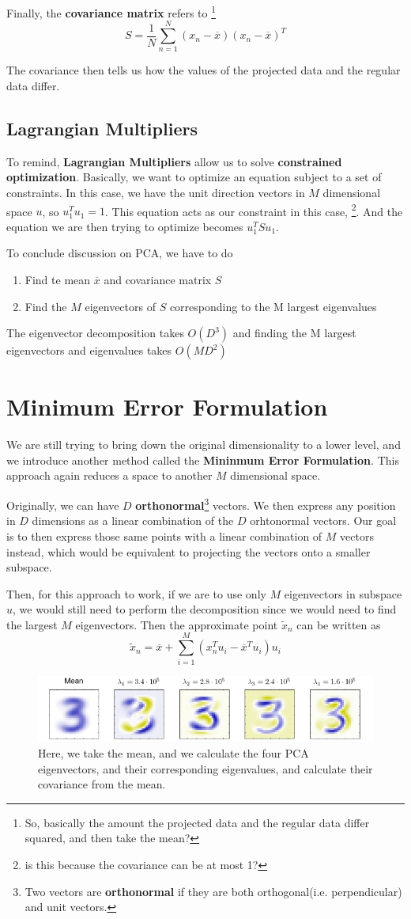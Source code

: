 \documentclass{tufte-handout}
\begin{document}
Finally, the \textbf{covariance matrix} refers to \footnote{So, basically the amount the projected
data and the regular data differ squared, and then take the mean?}
\[ S = \frac{1}{N}\sum_{n=1}^{N}(x_{n} - \overline{x})(x_{n} - \overline{x})^{T}\]

The covariance then tells us how the values of the projected data and the regular data differ. 
\subsection{Lagrangian Multipliers}
To remind, \textbf{Lagrangian Multipliers} allow us to solve \textbf{constrained optimization}. Basically,
we want to optimize an equation subject to a set of constraints. In this case, we have the unit direction vectors
in $M$ dimensional space $u$, so $u_{1}^{T}u_{1} = 1$. This equation acts as our constraint in this case,
\footnote{is this because the covariance can be at most 1?}. And the equation we are then trying to optimize
becomes $u^{T}_{1}Su_{1}$.  

To conclude discussion on PCA, we have to do
\begin{enumerate}
		\item{Find te mean $\overline{x}$ and covariance matrix $S$}
		\item{Find the $M$ eigenvectors of $S$ corresponding to the M largest eigenvalues}
\end{enumerate}
The	eigenvector decomposition takes $O(D^{3})$ and finding the M largest eigenvectors and eigenvalues 
takes $O(MD^{2})$
\section{Minimum Error Formulation}
We are still trying to bring down the original dimensionality to a lower level, and we introduce another 
method called the \textbf{Mininmum Error Formulation}. This approach again reduces a space to another 
$M$ dimensional space. 

Originally, we can have $D$ \textbf{orthonormal}\footnote{Two vectors are \textbf{orthonormal} if they are
both orthogonal(i.e. perpendicular) and unit vectors.} vectors. We then express any position in $D$ dimensions
as a linear combination of the $D$ orhtonormal vectors. Our goal is to then express those same points with a
linear combination of $M$ vectors instead, which would be equivalent to projecting the vectors onto a smaller
subspace.

Then, for this approach to work, if we are to use only $M$ eigenvectors in subspace $u$, we would still need to
perform the decomposition since we would need to find the largest $M$ eigenvectors. Then the approximate point
$\tilde{x}_{n}$ can be written as
\[ \tilde{x}_{n} = \overline{x} + \sum_{i=1}^{M}(x^{T}_{n}u_{i} - \overline{x}^{T}u_{i})u_{i}\]

\begin{center}
	\begin{figure}
		\includegraphics[scale=0.4]{number_class}
		\caption{Here, we take the mean, and we calculate the four PCA eigenvectors, and their 
			corresponding eigenvalues, and calculate their covariance from the mean.}
	\end{figure}
\end{center}
\end{document}

